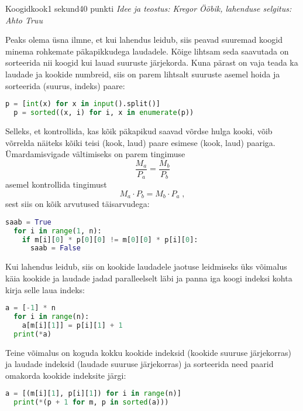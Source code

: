 \begin{yl}{4}{Koogid}{kook}{1 sekund}{40 punkti}
  \emph{Idee ja teostus: Kregor Ööbik, lahenduse selgitus: Ahto Truu}

  Peaks olema üsna ilmne, et kui lahendus leidub, siis peavad suuremad koogid minema rohkemate päkapikkudega laudadele. Kõige lihtsam seda saavutada on sorteerida nii koogid kui lauad suuruste järjekorda. Kuna pärast on vaja teada ka laudade ja kookide numbreid, siis on parem lihtsalt suuruste asemel hoida ja sorteerida (suurus, indeks) paare:
  \begin{lstlisting}[language=Python]
  p = [int(x) for x in input().split()]
  p = sorted((x, i) for i, x in enumerate(p))
  \end{lstlisting}

  Selleks, et kontrollida, kas kõik päkapikud saavad võrdse hulga kooki, võib võrrelda näiteks kõiki teisi (kook, laud) paare esimese (kook, laud) paariga. Ümardamisvigade vältimiseks on parem tingimuse $$\frac{M_a}{P_a} = \frac{M_b}{P_b}$$ asemel kontrollida tingimust $$M_a \cdot P_b = M_b \cdot P_a\;,$$ sest siis on kõik arvutused täisarvudega:
  \begin{lstlisting}[language=Python]
  saab = True
  for i in range(1, n):
    if m[i][0] * p[0][0] != m[0][0] * p[i][0]:
      saab = False
  \end{lstlisting}

  Kui lahendus leidub, siis on kookide laudadele jaotuse leidmiseks üks võimalus käia kookide ja laudade jadad paralleelselt läbi ja panna iga koogi indeksi kohta kirja selle laua indeks:
  \begin{lstlisting}[language=Python]
  a = [-1] * n
  for i in range(n):
    a[m[i][1]] = p[i][1] + 1
  print(*a)
  \end{lstlisting}

  Teine võimalus on koguda kokku kookide indeksid (kookide suuruse järjekorras) ja laudade indeksid (laudade suuruse järjekorras) ja sorteerida need paarid omakorda kookide indeksite järgi:
  \begin{lstlisting}[language=Python]
  a = [(m[i][1], p[i][1]) for i in range(n)]
  print(*(p + 1 for m, p in sorted(a)))
  \end{lstlisting}

\end{yl}
